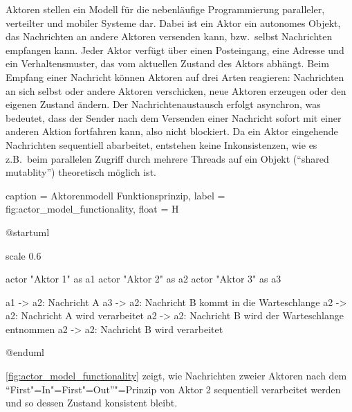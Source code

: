 Aktoren stellen ein Modell für die nebenläufige Programmierung paralleler, verteilter und mobiler Systeme dar.
Dabei ist ein Aktor ein autonomes Objekt, das Nachrichten an andere Aktoren versenden kann, bzw.\ selbst Nachrichten empfangen kann.
Jeder Aktor verfügt über einen Posteingang, eine Adresse und ein Verhaltensmuster, das vom aktuellen Zustand des Aktors abhängt.
Beim Empfang einer Nachricht können Aktoren auf drei Arten reagieren:
Nachrichten an sich selbst oder andere Aktoren verschicken, neue Aktoren erzeugen oder den eigenen Zustand ändern.
Der Nachrichtenaustausch erfolgt asynchron, was bedeutet, dass der Sender nach dem Versenden einer Nachricht sofort mit einer anderen Aktion fortfahren kann, also nicht blockiert.
Da ein Aktor eingehende Nachrichten sequentiell abarbeitet, entstehen keine Inkonsistenzen, wie es z.B.\ beim parallelen Zugriff durch mehrere Threads auf ein Objekt (\enquote{shared mutablity}) theoretisch möglich ist.

\begin{dhbwfigure}{%
    caption	= Aktorenmodell Funktionsprinzip,
    label	= fig:actor_model_functionality,
    float   = H
}
\begin{plantuml}
@startuml

scale 0.6

actor "Aktor 1" as a1
actor "Aktor 2" as a2
actor "Aktor 3" as a3

a1 -> a2: Nachricht A
a3 -> a2: Nachricht B kommt in die Warteschlange
a2 -> a2: Nachricht A wird verarbeitet
a2 -> a2: Nachricht B wird der Warteschlange entnommen
a2 -> a2: Nachricht B wird verarbeitet

@enduml
\end{plantuml}
\end{dhbwfigure}

\autoref{fig:actor_model_functionality} zeigt, wie Nachrichten zweier Aktoren nach dem \enquote{First"=In"=First"=Out}"=Prinzip von Aktor 2 sequentiell verarbeitet werden und so dessen Zustand konsistent bleibt.

